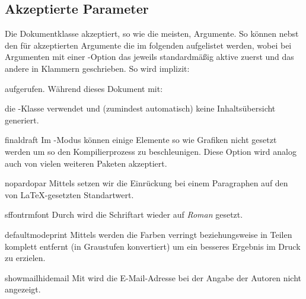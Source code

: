 \documentclass[useartcl,notoc]{sopra-paper}
\begin{document}
    \subsection{Akzeptierte Parameter}
    Die Dokumentklasse akzeptiert, so wie die meisten, Argumente. So können
    nebst den für  akzeptierten Argumente die im folgenden
    aufgelistet werden, wobei bei Argumenten mit einer -Option
    das jeweils standardmäßig aktive zuerst und das andere in Klammern
    geschrieben. So wird implizit:
    aufgerufen. Während dieses Dokument mit:
    die -Klasse verwendet und (zumindest automatisch) keine Inhaltsübersicht generiert.

    \begin{argument}{final}{draft}
        Im -Modus können einige Elemente so wie Grafiken nicht
        gesetzt werden um so den Kompilierprozess zu beschleunigen.
        Diese Option wird analog auch von vielen weiteren Paketen akzeptiert.
    \end{argument}

    \begin{argument}{nopar}{dopar}
        Mittels  setzen wir die Einrückung bei einem Paragraphen
        auf den von \LaTeX-gesetzten Standartwert.
    \end{argument}


    \begin{argument}{sffont}{rmfont}
        Durch  wird die Schriftart wieder auf \emph{Roman} gesetzt.
    \end{argument}

    \begin{argument}{defaultmode}{print}
        Mittels  werden die Farben verringt beziehungsweise in Teilen
        komplett entfernt (in Graustufen konvertiert) um ein besseres Ergebnis
        im Druck zu erzielen.
    \end{argument}

    \begin{argument}{showmail}{hidemail}
        Mit  wird die E-Mail-Adresse bei der Angabe der Autoren
        nicht angezeigt.
    \end{argument}
\end{document}
